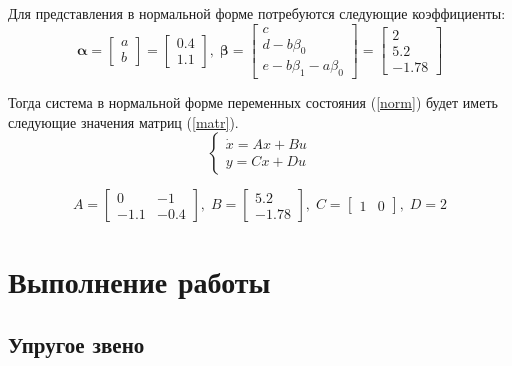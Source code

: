 	Для представления в нормальной форме потребуются следующие коэффициенты:
	\begin{equation*}
		\mathbf{\alpha} = \begin{bmatrix} a \\ b \end{bmatrix} = \begin{bmatrix} 0.4 \\ 1.1 \end{bmatrix},\;
		\mathbf{\beta} = \begin{bmatrix} c \\ d - b\beta_0 \\ e - b\beta_1 - a\beta_0 \end{bmatrix} =
		\begin{bmatrix} 2 \\ 5.2 \\ -1.78 \end{bmatrix}
	\end{equation*}

	Тогда система в нормальной форме переменных состояния (\ref{norm}) будет иметь следующие значения матриц (\ref{matr}).
	\begin{equation}
		\begin{cases}
			\dot{x} = Ax + Bu \\
			y = Cx + Du
		\end{cases}
		\label{norm}
	\end{equation}

	\begin{equation}
		A = \begin{bmatrix}
			0    & -1 \\
			-1.1 & -0.4
		\end{bmatrix},\; 
		B = \begin{bmatrix}5.2 \\ -1.78\end{bmatrix},\;
		C = \begin{bmatrix}1 & 0\end{bmatrix},\;
		D = 2
		\label{matr}
	\end{equation}

	\section{Выполнение работы}
	
	\subsection{Упругое звено}
	
